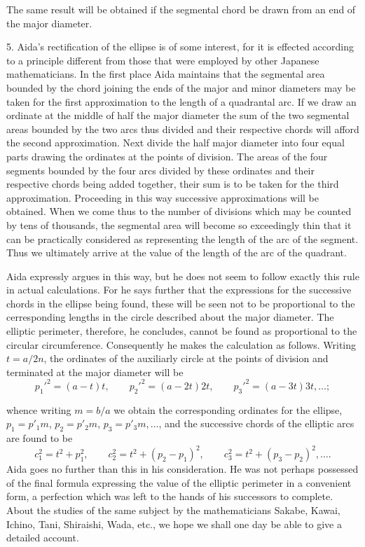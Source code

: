 \documentclass[11pt]{article}
\newcommand{\scanpage}[2]{\clearpage\setcounter{footnote}{0}\noindent{\footnotesize\color{gray}PDF page #1 · #2}\par\medskip}
\newcommand{\scanfooter}{}
\begin{document}
The same result will be obtained if the segmental chord be drawn from an end of the major diameter.

5. Aida's rectification of the ellipse is of some interest, for it is effected according to a principle different from those that were employed by other Japanese mathematicians. In the first place Aida maintains that the segmental area bounded by the chord joining the ends of the major and minor diameters may be taken for the first approximation to the length of a quadrantal arc. If we draw an ordinate at the middle of half the major diameter the sum of the two segmental areas bounded by the two arcs thus divided and their respective chords will afford the second approximation. Next divide the half major diameter into four equal parts drawing the ordinates at the points of division. The areas of the four segments bounded by the four arcs divided by these ordinates and their respective chords being added together, their sum is to be taken for the third approximation. Proceeding in this way successive approximations will be obtained. When we come thus to the number of divisions which may be counted by tens of thousands, the segmental area will become so exceedingly thin that it can be practically considered as representing the length of the arc of the segment. Thus we ultimately arrive at the value of the length of the arc of the quadrant.

Aida expressly argues in this way, but he does not seem to follow exactly this rule in actual calculations. For he says further that the expressions for the successive chords in the ellipse being found, these will be seen not to be proportional to the cerresponding lengths in the circle described about the major diameter. The elliptic perimeter, therefore, he concludes, cannot be found as proportional to the circular circumference. Consequently he makes the calculation as follows. Writing $t=a/2n$, the ordinates of the auxiliarly circle at the points of division and terminated at the major diameter will be
\[
p_1'^2=(a-t)t,
\qquad p_2'^2=(a-2t)2t,
\qquad p_3'^2=(a-3t)3t,\ldots;
\]
\scanfooter

\scanpage{0267}{Chapter 37, printed page 253}
whence writing $m=b/a$ we obtain the corresponding ordinates for the ellipse, $p_1=p'_1m$, $p_2=p'_2m$, $p_3=p'_3m,\ldots$, and the successive chords of the elliptic arcs are found to be
\[
c_1^2=t^2+p_1^2,
\qquad c_2^2=t^2+(p_2-p_1)^2,
\qquad c_3^2=t^2+(p_3-p_2)^2,\ldots.
\]
Aida goes no further than this in his consideration. He was not perhaps possessed of the final formula expressing the value of the elliptic perimeter in a convenient form, a perfection which was left to the hands of his successors to complete. About the studies of the same subject by the mathematicians Sakabe, Kawai, Ichino, Tani, Shiraishi, Wada, etc., we hope we shall one day be able to give a detailed account.
\end{document}
